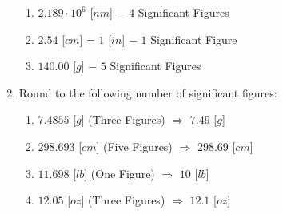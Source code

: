 \documentclass[12pt]{article}
\begin{document}
\begin{enumerate}
\begin{enumerate}
      \item $2.189 \cdot 10^6$ [$nm$] $-$ $4$ Significant Figures

      \item $2.54$ [$cm$] = $1$ [$in$] $-$ $1$ Significant Figure

      \item $140.00$ [$g$] $-$ $5$ Significant Figures

    \end{enumerate}

  \item Round to the following number of significant figures:

    \begin{enumerate}

      \item $7.4855$ [$g$] (Three Figures) $\Rightarrow$ $7.49$ [$g$]

      \item $298.693$ [$cm$] (Five Figures) $\Rightarrow$ $298.69$ [$cm$]

      \item $11.698$ [$lb$] (One Figure) $\Rightarrow$ $10$ [$lb$]

      \item $12.05$ [$oz$] (Three Figures) $\Rightarrow$ $12.1$ [$oz$]

    \end{enumerate}

\end{enumerate}
\end{document}
